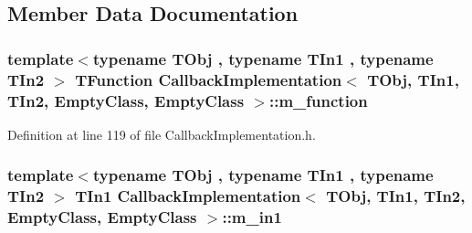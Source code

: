 \subsection{Member Data Documentation}
\hypertarget{class_callback_implementation_3_01_t_obj_00_01_t_in1_00_01_t_in2_00_01_empty_class_00_01_empty_class_01_4_a6410bb63391988a578b4784efb876301}{
\subsubsection[{m\-\_\-function}]{\setlength{\rightskip}{0pt plus 5cm}template$<$typename T\-Obj , typename T\-In1 , typename T\-In2 $>$ {\bf T\-Function} {\bf Callback\-Implementation}$<$ T\-Obj, T\-In1, T\-In2, {\bf Empty\-Class}, {\bf Empty\-Class} $>$\-::m\-\_\-function\hspace{0.3cm}{\ttfamily [private]}}}\label{class_callback_implementation_3_01_t_obj_00_01_t_in1_00_01_t_in2_00_01_empty_class_00_01_empty_class_01_4_a6410bb63391988a578b4784efb876301}


Definition at line 119 of file Callback\-Implementation.\-h.

\hypertarget{class_callback_implementation_3_01_t_obj_00_01_t_in1_00_01_t_in2_00_01_empty_class_00_01_empty_class_01_4_a01a0c37f52b6e1fa4cdfbd9292ad4a49}{
\subsubsection[{m\-\_\-in1}]{\setlength{\rightskip}{0pt plus 5cm}template$<$typename T\-Obj , typename T\-In1 , typename T\-In2 $>$ T\-In1 {\bf Callback\-Implementation}$<$ T\-Obj, T\-In1, T\-In2, {\bf Empty\-Class}, {\bf Empty\-Class} $>$\-::m\-\_\-in1\hspace{0.3cm}{\ttfamily [private]}}}\label{class_callback_implementation_3_01_t_obj_00_01_t_in1_00_01_t_in2_00_01_empty_class_00_01_empty_class_01_4_a01a0c37f52b6e1fa4cdfbd9292ad4a49}


